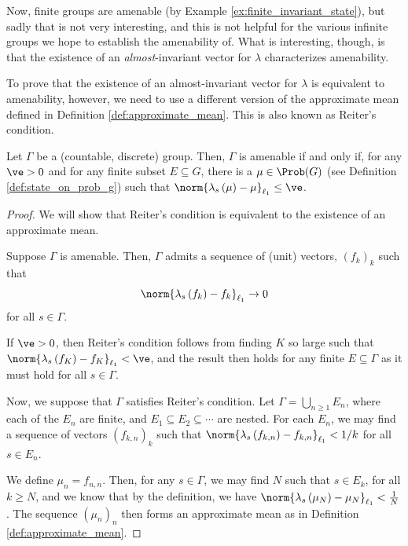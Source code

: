 Now, finite groups are amenable (by Example \ref{ex:finite_invariant_state}), but sadly that is not very interesting, and this is not helpful for the various infinite groups we hope to establish the amenability of. What is interesting, though, is that the existence of an \textit{almost}-invariant vector for $\lambda$ characterizes amenability.\newline

To prove that the existence of an almost-invariant vector for $\lambda$ is equivalent to amenability, however, we need to use a different version of the approximate mean defined in Definition \ref{def:approximate_mean}. This is also known as Reiter's condition.
\begin{theorem}\label{thm:reiter}
  Let $\Gamma$ be a (countable, discrete) group. Then, $\Gamma$ is amenable if and only if, for any $\ve > 0$ and for any finite subset $E\subseteq G$, there is a $\mu\in \Prob(G)$ (see Definition \ref{def:state_on_prob_g}) such that $\norm{\lambda_s\left( \mu \right) - \mu}_{\ell_1} \leq \ve$.
\end{theorem}
\begin{proof}
  We will show that Reiter's condition is equivalent to the existence of an approximate mean.\newline

  Suppose $\Gamma$ is amenable. Then, $\Gamma$ admits a sequence of (unit) vectors, $\left( f_k \right)_k$ such that 
  \begin{align*}
    \norm{\lambda_s\left( f_k \right) - f_k}_{\ell_1}\rightarrow 0
  \end{align*}
   for all $s\in\Gamma$.\newline

   If $\ve > 0$, then Reiter's condition follows from finding $K$ so large such that $\norm{\lambda_s\left( f_K \right) - f_K}_{\ell_1} < \ve$, and the result then holds for any finite $E\subseteq \Gamma$ as it must hold for all $s\in \Gamma$.\newline

   Now, we suppose that $\Gamma$ satisfies Reiter's condition. Let $\Gamma = \bigcup_{n\geq 1}E_n$, where each of the $E_n$ are finite, and $E_1\subseteq E_2\subseteq \cdots$ are nested. For each $E_n$, we may find a sequence of vectors $\left( f_{k,n} \right)_k$ such that $\norm{\lambda_s\left( f_{k,n} \right) - f_{k,n}}_{\ell_1} < 1/k$ for all $s\in E_n$.\newline

   We define $\mu_{n} = f_{n,n}$. Then, for any $s\in \Gamma$, we may find $N$ such that $s\in E_{k}$, for all $k\geq N$, and we know that by the definition, we have $\norm{\lambda_s\left( \mu_{N} \right) - \mu_{N}}_{\ell_1} < \frac{1}{N}$. The sequence $\left( \mu_{n} \right)_{n}$ then forms an approximate mean as in Definition \ref{def:approximate_mean}.
\end{proof}

